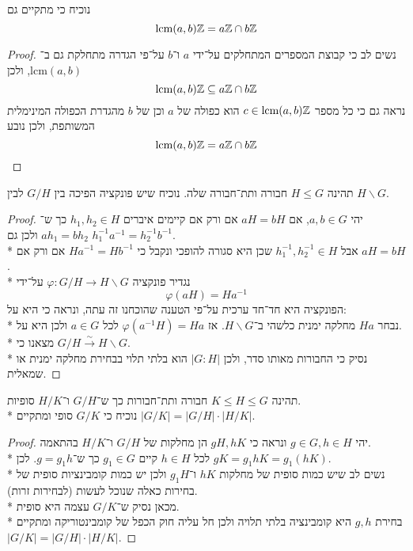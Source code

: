 \Subquestion{}
נוכיח כי מתקיים גם
\[
	\text{lcm}(a, b)\mathbb{Z} = a\mathbb{Z} \cap b\mathbb{Z}
\]
\begin{proof}
	נשים לב כי קבוצת המספרים המתחלקים על־ידי $a$ ו־$b$ על־פי הגדרה מתחלקת גם ב־$\text{lcm}(a, b)$, ולכן
	\[
		\text{lcm}(a, b)\mathbb{Z} \subseteq a\mathbb{Z} \cap b\mathbb{Z}
	\]
	נראה גם כי כל מספר $c \in \text{lcm}(a, b)\mathbb{Z}$ הוא כפולה של $a$ וכן של $b$ מהגדרת הכפולה המינימלית המשותפת, ולכן נובע
	\[
		\text{lcm}(a, b)\mathbb{Z} = a\mathbb{Z} \cap b\mathbb{Z}
	\]
\end{proof}

\Question{}
\Subquestion{}
תהינה $H \le G$ חבורה ותת־חבורה שלה. נוכיח שיש פונקציה הפיכה בין $G / H$ לבין $H \backslash G$.
\begin{proof}
	יהי $a, b \in G$, אם $a H = b H$ אם ורק אם קיימים איברים $h_1, h_2 \in H$ כך ש־$a h_1 = b h_2$ ולכן גם $h_1^{-1} a^{-1} = h_2^{-1} b^{-1}$. \\*
	אבל $h_1^{-1}, h_2^{-1} \in H$ שכן היא סגורה להופכי ונקבל כי $H a^{-1} = H b^{-1}$ אם ורק אם $a H = b H$. \\*
	נגדיר פונקציה $\varphi : G/H \to H\backslash G$ על־ידי
	\[
		\varphi(a H) = H a^{-1}
	\]
	הפונקציה היא חד־חד ערכית על־פי הטענה שהוכחנו זה עתה, ונראה כי היא על: \\*
	נבחר $H a$ מחלקה ימנית כלשהי ב־$H \backslash G$. אז $\varphi(a^{-1} H) = H a$ לכל $a \in G$ ולכן היא על. \\*
	מצאנו כי $G / H \xrightarrow{\sim} H \backslash G$. \\*
	נסיק כי החבורות מאותו סדר, ולכן $|G : H|$ הוא בלתי תלוי בבחירת מחלקה ימנית או שמאלית.
\end{proof}

\Subquestion{}
תהינה $K \le H \le G$ חבורה ותת־חבורות כך ש־$G / H$ ו־$H / K$ סופיות. \\*
נוכיח כי $G / K$ סופי ומתקיים $|G/K| = |G/H| \cdot |H/K|$.
\begin{proof}
	יהי $g \in G, h \in H$ ונראה כי $gH, hK$ הן מחלקות של $G/H$ ו־$H/K$ בהתאמה. \\*
	לכל $h \in H$ קיים $g_1 \in G$ כך ש־$g = g_1 h$.
	לכן $g K = g_1 h K = g_1 (h K)$. \\*
	נשים לב שיש כמות סופית של מחלקות $h K$ ו־$g_1 H$ ולכן יש כמות קומבינציות סופית של בחירות כאלה שנוכל לעשות (לבחירות זרות). \\*
	מכאן נסיק ש־$G / K$ עצמה היא סופית. \\*
	בחירת $g, h$ היא קומבינציה בלתי תלויה ולכן חל עליה חוק הכפל של קומבינטוריקה ומתקיים $|G/K| = |G/H| \cdot |H/K|$.
\end{proof}

